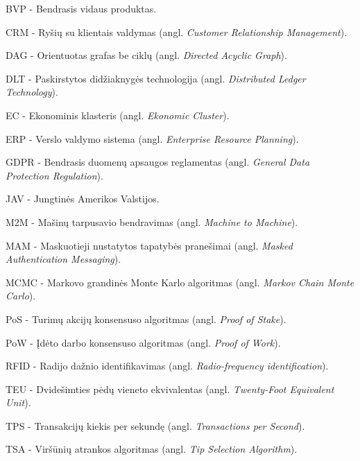
BVP - Bendrasis vidaus produktas.

CRM - Ryšių su klientais valdymas (angl. \textit{Customer Relationship Management}).

DAG - Orientuotas grafas be ciklų (angl. \textit{Directed Acyclic Graph}).

DLT - Paskirstytos didžiaknygės technologija (angl. \textit{Distributed Ledger Technology}).

EC - Ekonominis klasteris (angl. \textit{Ekonomic Cluster}).

ERP - Verslo valdymo sistema (angl. \textit{Enterprise Resource Planning}).

GDPR - Bendrasis duomenų apsaugos reglamentas (angl. \textit{General Data Protection Regulation}).

JAV - Jungtinės Amerikos Valstijos.

M2M - Mašinų tarpusavio bendravimas (angl. \textit{Machine to Machine}).

MAM - Maskuotieji nustatytos tapatybės pranešimai (angl. \textit{Masked Authentication Messaging}).

MCMC - Markovo grandinės Monte Karlo algoritmas (angl. \textit{Markov Chain Monte Carlo}).

PoS - Turimų akcijų konsensuso algoritmas (angl. \textit{Proof of Stake}).

PoW - Įdėto darbo konsensuso algoritmas (angl. \textit{Proof of Work}).

RFID - Radijo dažnio identifikavimas (angl. \textit{Radio-frequency identification}).

TEU - Dvidešimties pėdų vieneto ekvivalentas (angl. \textit{Twenty-Foot Equivalent Unit}).

TPS - Transakcijų kiekis per sekundę (angl. \textit{Transactions per Second}).

TSA - Viršūnių atrankos algoritmas (angl. \textit{Tip Selection Algorithm}).